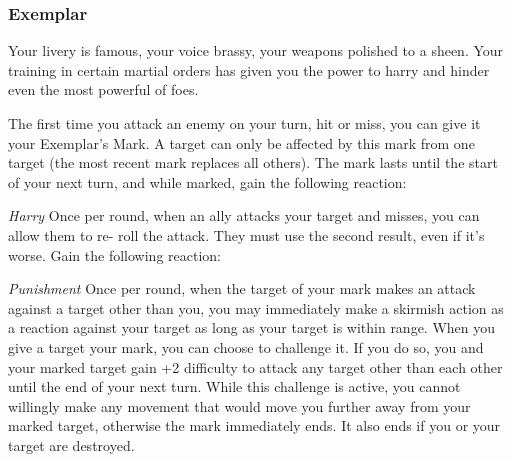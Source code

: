 \subsubsection{Exemplar}

\begin{talent}
{Your livery is famous, your voice brassy, your weapons polished to a sheen. Your training in certain martial orders has given you the power to harry and hinder even the most powerful of foes.}

The first time you attack an enemy on your turn, hit or miss, you can give it your Exemplar’s Mark. A target can only be affected by this mark from one target (the most recent mark replaces all others). 
The mark lasts until the start of your next turn, and while marked, gain the
following reaction:

\textit{Harry}\newline 
\Reaction\newline 
Once per round, when an ally attacks your target and misses, you can allow them to re- roll the attack. They must use the second result, even if it’s worse.
Gain the following reaction:

\textit{Punishment}\newline
\Reaction\newline 
Once per round, when the target of your mark makes an attack against a target other than you, you may immediately make a skirmish action as a reaction against your target as long as your target is within range.
When you give a target your mark, you can choose to challenge it. If you do so, you and your marked target gain +2 difficulty to attack any target other than each other until the end of your next turn. While this challenge is active, you cannot willingly make any movement that would move you further away from your marked target, otherwise the mark immediately ends. It also ends if you or your target are destroyed.
\end{talent}